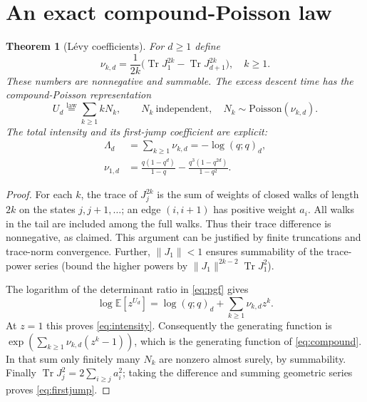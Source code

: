 \documentclass[11pt]{article}
\newtheorem{theorem}{Theorem}[section]
\theoremstyle{definition}\newtheorem{definition}[theorem]{Definition}
\newcommand{\Exp}{\mathbb E}
\newcommand{\tr}{\operatorname{Tr}}
\begin{document}
\section{An exact compound-Poisson law}
\begin{theorem}[L\'evy coefficients]\label{thm:poisson}
For $d\geq1$ define
\begin{equation}\label{eq:levy}
 \boxed{\nu_{k,d}=\frac{1}{2k}\bigl(\tr J_1^{2k}-\tr J_{d+1}^{2k}\bigr),\quad k\geq1.}
\end{equation}
These numbers are nonnegative and summable. The excess descent time has the compound-Poisson representation
\begin{equation}\label{eq:compound}
 U_d\overset{\mathrm{law}}{=}\sum_{k\geq1} k N_k,
 \qquad N_k\ \text{independent},\quad N_k\sim\mathrm{Poisson}(\nu_{k,d}).
\end{equation}
The total intensity and its first-jump coefficient are explicit:
\begin{align}
 \Lambda_d&=\sum_{k\geq1}\nu_{k,d}=-\log(q;q)_d,\label{eq:intensity}\\
 \nu_{1,d}&=\frac{q(1-q^d)}{1-q}-\frac{q^3(1-q^{2d})}{1-q^2}.\label{eq:firstjump}
\end{align}
\end{theorem}
\begin{proof}
For each $k$, the trace of $J_j^{2k}$ is the sum of weights of closed walks of length $2k$ on the states $j,j+1,\dots$; an edge $(i,i+1)$ has positive weight $a_i$. All walks in the tail are included among the full walks. Thus their trace difference is nonnegative, as claimed. This argument can be justified by finite truncations and trace-norm convergence. Further, $\|J_1\|<1$ ensures summability of the trace-power series (bound the higher powers by $\|J_1\|^{2k-2}\tr J_1^2$).

The logarithm of the determinant ratio in \eqref{eq:pgf} gives
\[
 \log\Exp[z^{U_d}]=\log(q;q)_d+\sum_{k\geq1}\nu_{k,d}z^k.
\]
At $z=1$ this proves \eqref{eq:intensity}. Consequently the generating function is $\exp(\sum_{k\geq1}\nu_{k,d}(z^k-1))$, which is the generating function of \eqref{eq:compound}. In that sum only finitely many $N_k$ are nonzero almost surely, by summability. Finally $\tr J_j^2=2\sum_{i\geq j}a_i^2$; taking the difference and summing geometric series proves \eqref{eq:firstjump}.
\end{proof}
\end{document}
